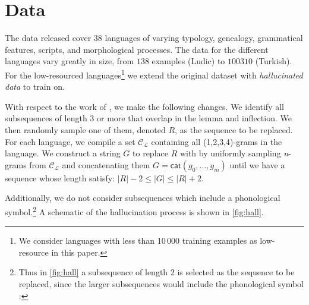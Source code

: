 \documentclass[11pt,a4paper]{article}
\begin{document}

\section{Data}

The data released cover $38$ languages of varying typology, genealogy,
grammatical features, scripts, and morphological processes. The data
for the different languages vary greatly in size, from $138$ examples
(Ludic) to $100310$ (Turkish).  For the low-resourced
languages\footnote{We consider languages with less than 10\,000
training examples as low-resource in this paper.} we extend the
original dataset with \emph{hallucinated data}
\cite{DBLP:conf/emnlp/AnastasopoulosN19} to train on.

With respect to the work of \citet{DBLP:conf/emnlp/AnastasopoulosN19},
we make the following changes. We identify all subsequences of length
$3$ or more that overlap in the lemma and inflection. We then randomly
sample one of them, denoted $R$, as the sequence to be replaced.  For
each language, we compile a set $\mathcal{C_L}$ containing all
(1,2,3,4)-grams in the language. We construct a string $G$ to replace
$R$ with by uniformly sampling \textit{n}-grams from $\mathcal{C_L}$
and concatenating them $G = \mathsf{cat}(g_0, ..., g_m)$ until we have
a sequence whose length satisfy: $|R|-2 \leq |G| \leq |R|+2$.



Additionally, we do not consider subsequences which include a
phonological symbol.\footnote{Thus in \cref{fig:hall} a subsequence of
length 2 is selected as the sequence to be replaced, since the larger subsequences
would include the phonological symbol :}  A schematic of the hallucination
process is shown in \cref{fig:hall}.
\end{document}
